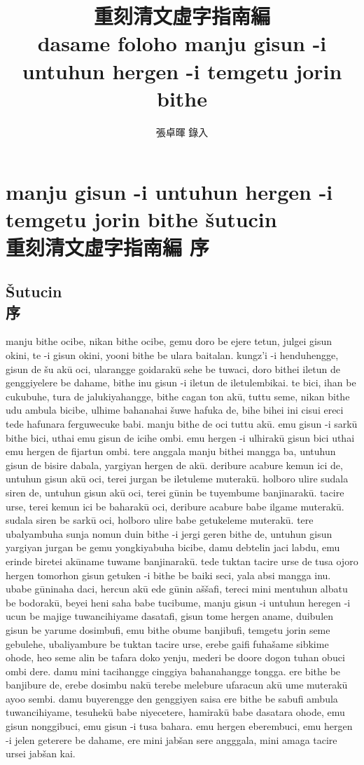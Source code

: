 \documentclass{article}
\title{重刻清文虛字指南編\\dasame foloho manju gisun -i untuhun hergen -i temgetu jorin bithe}
\author{張卓暉 錄入}
\begin{document}
    \maketitle

\tableofcontents

\section{manju gisun -i untuhun hergen -i temgetu jorin bithe \v{s}utucin\\
重刻清文虛字指南編 序}

\subsection{\v{S}utucin\\序}
manju bithe ocibe, nikan bithe ocibe, gemu doro be ejere tetun, julgei gisun okini, te -i gisun okini, yooni bithe be ulara baitalan. kungz'i -i henduhengge, gisun de \v{s}u ak\={u} oci, ularangge goidarak\={u} sehe be tuwaci, doro bithei iletun de genggiyelere be dahame, bithe inu gisun -i iletun de iletulembikai. te bici, ihan be cukubuhe, tura de jalukiyahangge, bithe cagan ton ak\={u}, tuttu seme, nikan bithe udu ambula bicibe, ulhime bahanahai \v{s}uwe hafuka de, bihe bihei ini cisui ereci tede hafunara ferguwecuke babi. manju bithe de oci tuttu ak\={u}. emu gisun -i sark\={u} bithe bici, uthai emu gisun de icihe ombi. emu hergen -i ulhirak\={u} gisun bici uthai emu hergen de fijartun ombi. tere anggala manju bithei mangga ba, untuhun gisun de bisire dabala, yargiyan hergen de ak\={u}. deribure acabure kemun ici de, untuhun gisun ak\={u} oci, terei jurgan be iletuleme muterak\={u}. holboro ulire sudala siren de, untuhun gisun ak\={u} oci, terei g\={u}nin be tuyembume banjinarak\={u}. tacire urse, terei kemun ici be baharak\={u} oci, deribure acabure babe ilgame muterak\={u}. sudala siren be sark\={u} oci, holboro ulire babe getukeleme muterak\={u}. tere ubalyambuha sunja nomun duin bithe -i jergi geren bithe de, untuhun gisun yargiyan jurgan be gemu yongkiyabuha bicibe, damu debtelin jaci labdu, emu erinde biretei ak\={u}name tuwame banjinarak\={u}. tede tuktan tacire urse de tusa ojoro hergen tomorhon gisun getuken -i bithe be baiki seci, yala absi mangga inu. ubabe g\={u}ninaha daci, hercun ak\={u} ede g\={u}nin a\v{s}\v{s}afi, tereci mini mentuhun albatu be bodorak\={u}, beyei heni saha babe tucibume, manju gisun -i untuhun heregen -i ucun be majige tuwancihiyame dasatafi, gisun tome hergen aname, duibulen gisun be yarume dosimbufi, emu bithe obume banjibufi, temgetu jorin seme gebulehe, ubaliyambure be tuktan tacire urse, erebe gaifi fuha\v{s}ame sibkime ohode, heo seme alin be tafara doko yenju, mederi be doore dogon tuhan obuci ombi dere. damu mini tacihangge cinggiya bahanahangge tongga. ere bithe be banjibure de, erebe dosimbu nak\={u} terebe melebure ufaracun ak\={u} ume muterak\={u} ayoo sembi. damu buyerengge den genggiyen saisa ere bithe be sabufi ambula tuwancihiyame, tesuhek\={u} babe niyecetere, hamirak\={u} babe dasatara ohode, emu gisun nonggibuci, emu gisun -i tusa bahara. emu hergen eberembuci, emu hergen -i jelen geterere be dahame, ere mini jab\v{s}an sere angggala, mini amaga tacire ursei jab\v{s}an kai.\\
\end{document}
